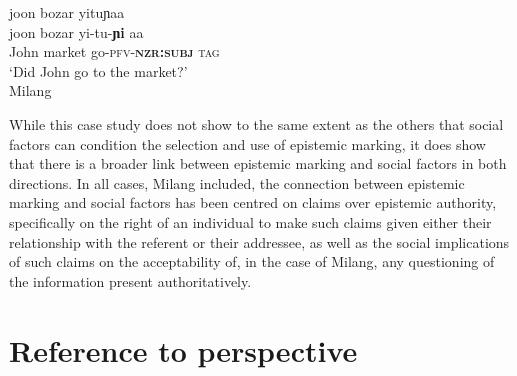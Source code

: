 \begin{exe}
    \ex \label{e:Discussion:MilangInter}
    \glll joon bozar yituɲaa \\
    joon bozar yi-tu-\textbf{ɲi} aa \\
    John market go-\textsc{pfv-\textbf{nzr:subj}} \textsc{tag} \\
    \glt `Did John go to the market?' \\
    Milang \cite[Siangic: India,][457]{Modi2017}
\end{exe}

While this case study does not show to the same extent as the others that social factors can condition the selection and use of epistemic marking, it does show that there is a broader link between epistemic marking and social factors in both directions. In all cases, Milang included, the connection between epistemic marking and social factors has been centred on claims over epistemic authority, specifically on the right of an individual to make such claims given either their relationship with the referent or their addressee, as well as the social implications of such claims on the acceptability of, in the case of Milang, any questioning of the information present authoritatively.

\section{Reference to perspective}\label{s:Discussion:Perspective}

